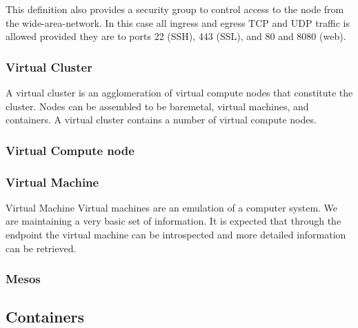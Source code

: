 \documentclass[10pt]{article}
\begin{document}
This definition also provides a security group to control access to
the node from the wide-area-network. In this case all ingress and
egress TCP and UDP traffic is allowed provided they are to ports 22
(SSH), 443 (SSL), and 80 and 8080 (web).





\subsubsection{Virtual Cluster}

A virtual cluster is an agglomeration of virtual compute nodes that
constitute the cluster. Nodes can be assembled to be baremetal,
virtual machines, and containers. A virtual cluster contains a number
of virtual compute nodes.  
 

\subsubsection{Virtual Compute node}


\subsubsection{Virtual Machine}

Virtual Machine 
Virtual machines are an emulation of a computer system. We are maintaining a very basic set of information. It is expected that through the endpoint the virtual machine can be introspected and more detailed information can be retrieved. 


\subsubsection{Mesos}



\subsection{Containers}
\end{document}
